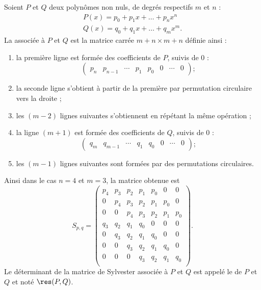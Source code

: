 Soient \( P\) et \( Q\) deux polynômes non nuls, de degrés respectifs \( m\) et \( n\) :
\begin{subequations}
    \begin{align}
        P(x)=p_0+p_1x+\ldots +p_nx^n\\
        Q(x)=q_0+q_1x+\ldots +q_mx^m.
    \end{align}
\end{subequations}
La  associée à \( P\) et \( Q\) est la matrice carrée \( m+n\times m+n\) définie ainsi :
\begin{enumerate}
    \item
la première ligne est formée des coefficients de \( P\), suivis de 0 :
\begin{equation}
\begin{pmatrix} p_n & p_{n-1} & \cdots & p_1 & p_0 & 0 & \cdots & 0 \end{pmatrix} ;
\end{equation}
\item la seconde ligne s'obtient à partir de la première par permutation circulaire vers la droite ;
\item les $(m-2)$ lignes suivantes s'obtiennent en répétant la même opération ;
\item la ligne $(m+1)$ est formée des coefficients de \( Q\), suivis de 0 :
    \begin{equation}
    \begin{pmatrix} q_m & q_{m-1} & \cdots & q_1 & q_0 & 0 & \cdots & 0 \end{pmatrix} ;
    \end{equation}
    \item les $(m-1)$ lignes suivantes sont formées par des permutations circulaires.
\end{enumerate}

Ainsi dans le cas $n=4$ et $m=3$, la matrice obtenue est
\begin{equation}    \label{EqPEgtle}
S_{p,q}=\begin{pmatrix} 
p_4 & p_3 & p_2 & p_1 & p_0 & 0 & 0 \\
0 & p_4 & p_3 & p_2 & p_1 & p_0 & 0 \\
0 & 0 & p_4 & p_3 & p_2 & p_1 & p_0 \\
q_3 & q_2 & q_1 & q_0 & 0 & 0 & 0 \\
0 & q_3 & q_2 & q_1 & q_0 & 0 & 0 \\
0 & 0 & q_3 & q_2 & q_1 & q_0 & 0 \\
0 & 0 & 0 & q_3 & q_2 & q_1 & q_0 \\
\end{pmatrix}.
\end{equation}
Le déterminant de la matrice de Sylvester associée à \( P\) et \( Q\) est appelé le  de \( P\) et \( Q\) et noté \( \res(P,Q)\).

